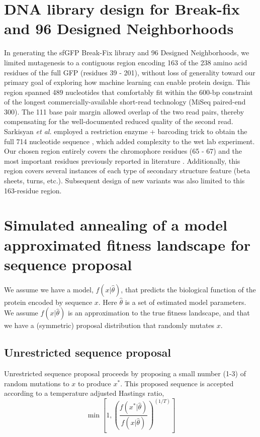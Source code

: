 \section{DNA library design for Break-fix and 96 Designed Neighborhoods}
\label{sec:libdesign}

In generating the sfGFP Break-Fix library and 96 Designed Neighborhoods, we limited mutagenesis to a contiguous region encoding 163 of the 238 amino acid residues of the full GFP (residues 39 - 201), without loss of generality toward our primary goal of exploring how machine learning can enable protein design. This region spanned 489 nucleotides that comfortably fit within the 600-bp constraint of the longest commercially-available short-read technology (MiSeq paired-end 300). The 111 base pair margin allowed overlap of the two read pairs, thereby compensating for the well-documented reduced quality of the second read. Sarkisyan \emph{et al.} employed a restriction enzyme + barcoding trick to obtain the full 714 nucleotide sequence \cite{Sarkisyan2016-cr}, which added complexity to the wet lab experiment. Our chosen region entirely covers the chromophore residues (65 - 67) and the most important residues previously reported in literature \cite{Dedecker2013-hv}. Additionally, this region covers several instances of each type of secondary structure feature (beta sheets, turns, etc.). Subsequent design of new variants was also limited to this 163-residue region.



\section{Simulated annealing of a model approximated fitness landscape for sequence proposal} \label{sec:simanneal}

We assume we have a model, $f(x| \hat{\theta} )$, that predicts the biological function of the protein encoded by sequence $x$. Here $\hat{\theta}$ is a set of estimated model parameters. We assume $f(x| \hat{\theta} )$ is an approximation to the true fitness landscape, and that we have a (symmetric) proposal distribution that randomly mutates $x$. 

\subsection{Unrestricted sequence proposal}

Unrestricted sequence proposal proceeds by proposing a small number (1-3) of random mutations to $x$  to produce $x^*$. This proposed sequence is accepted according to a temperature adjusted Hastings ratio,
\[
\min\left[1, \left( \frac{f(x^*|\hat{\theta})}{f(x|\hat{\theta})}\right)^{(1/T)}   \right]
\]

